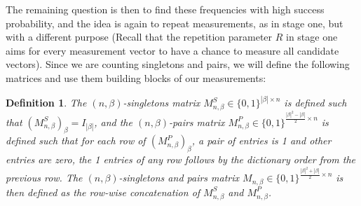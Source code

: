 \documentclass{article}
\newtheorem{definition}{Definition}[section]
\newtheorem{remark}{Remark}[section]
\begin{document}
The remaining question is then to find these frequencies with high success probability, and the idea is again to repeat measurements, as in stage one, but with a different purpose (Recall that the repetition parameter $R$ in stage one aims for every measurement vector to have a chance to measure all candidate vectors). Since we are counting singletons and pairs, we will define the following matrices and use them building blocks of our measurements:
\begin{definition}\label{def:nbspmatrix}
    The $(n,\beta)$-singletons matrix $M^S_{n,\beta}\in\{0,1\}^{|\beta|\times n}$ is defined such that $(M^S_{n,\beta})_\beta=I_{|\beta|}$, and the $(n,\beta)$-pairs matrix $M^P_{n,\beta}\in\{0,1\}^{\frac{|\beta|^2-|\beta|}{2}\times n}$ is defined such that for each row of $(M^P_{n,\beta})_\beta$, a pair of entries is 1 and other entries are zero, the 1 entries of any row follows by the dictionary order from the previous row. The $(n,\beta)$-singletons and pairs matrix $M_{n,\beta}\in\{0,1\}^{\frac{|\beta|^2+|\beta|}{2}\times n}$ is then defined as the row-wise concatenation of $M^S_{n,\beta}$ and $M^P_{n,\beta}$. 
\end{definition}
\end{document}
